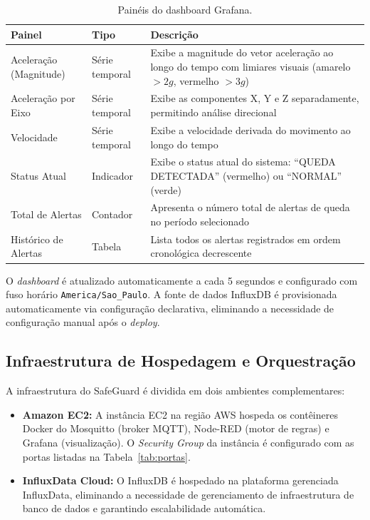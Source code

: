\documentclass[a4paper,12pt]{article}
\begin{document}
\begin{table}[H]
\centering
\caption{Painéis do dashboard Grafana.}
\label{tab:paineis}
\begin{tabularx}{\textwidth}{llX}
\toprule
\textbf{Painel} & \textbf{Tipo} & \textbf{Descrição} \\
\midrule
Aceleração (Magnitude) & Série temporal & Exibe a magnitude do vetor aceleração ao longo do tempo com limiares visuais (amarelo $> 2g$, vermelho $> 3g$) \\
Aceleração por Eixo & Série temporal & Exibe as componentes X, Y e Z separadamente, permitindo análise direcional \\
Velocidade & Série temporal & Exibe a velocidade derivada do movimento ao longo do tempo \\
Status Atual & Indicador & Exibe o status atual do sistema: ``QUEDA DETECTADA'' (vermelho) ou ``NORMAL'' (verde) \\
Total de Alertas & Contador & Apresenta o número total de alertas de queda no período selecionado \\
Histórico de Alertas & Tabela & Lista todos os alertas registrados em ordem cronológica decrescente \\
\bottomrule
\end{tabularx}
\end{table}

O \textit{dashboard} é atualizado automaticamente a cada 5 segundos e configurado com fuso horário \texttt{America/Sao\_Paulo}. A fonte de dados InfluxDB é provisionada automaticamente via configuração declarativa, eliminando a necessidade de configuração manual após o \textit{deploy}.

\subsection{Infraestrutura de Hospedagem e Orquestração}

A infraestrutura do SafeGuard é dividida em dois ambientes complementares:

\begin{itemize}[leftmargin=2cm]
    \item \textbf{Amazon EC2:} A instância EC2 na região AWS hospeda os contêineres Docker do Mosquitto (broker MQTT), Node-RED (motor de regras) e Grafana (visualização). O \textit{Security Group} da instância é configurado com as portas listadas na Tabela~\ref{tab:portas}.

    \item \textbf{InfluxData Cloud:} O InfluxDB é hospedado na plataforma gerenciada InfluxData, eliminando a necessidade de gerenciamento de infraestrutura de banco de dados e garantindo escalabilidade automática.
\end{itemize}
\end{document}
